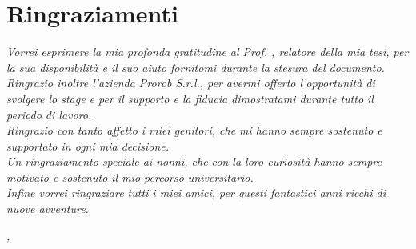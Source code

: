 \cleardoublepage
{}
{}



\bigskip

\begingroup
\let\clearpage\relax
\let\cleardoublepage\relax
\let\cleardoublepage\relax

\chapter*{Ringraziamenti}

\noindent \textit{Vorrei esprimere la mia profonda gratitudine al Prof. \myProf, relatore della mia tesi, per la sua disponibilità e il suo aiuto fornitomi durante la stesura del documento.}\\

\noindent \textit{Ringrazio inoltre l'azienda Prorob S.r.l., per avermi offerto l'opportunità di svolgere lo stage e per il supporto e la fiducia dimostratami durante tutto il periodo di lavoro.}\\

\noindent \textit{Ringrazio con tanto affetto i miei genitori, che mi hanno sempre sostenuto e supportato in ogni mia decisione.}\\

\noindent \textit{Un ringraziamento speciale ai nonni, che con la loro curiosità hanno sempre motivato e sostenuto il mio percorso universitario.}\\

\noindent \textit{Infine vorrei ringraziare tutti i miei amici, per questi fantastici anni ricchi di nuove avventure.}\\
\bigskip

\noindent\textit{\myLocation, \myTime}
\hfill \myName

\endgroup
